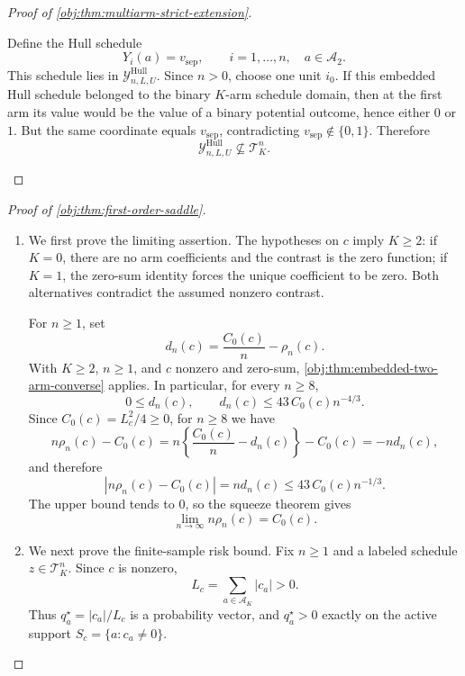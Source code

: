 \begin{proof}[Proof of \cref{obj:thm:multiarm-strict-extension}]
\begin{enumerate}
Define the Hull schedule
\[
Y_i(a)=v_{\mathrm{sep}},
\qquad
i=1,\ldots,n,\quad a\in\mathcal A_2 .
\]
This schedule lies in \(\mathcal Y^{\mathrm{Hull}}_{n,L,U}\). Since \(n>0\), choose one unit \(i_0\). If this embedded Hull schedule belonged to the binary \(K\)-arm schedule domain, then at the first arm its value would be the value of a binary potential outcome, hence either \(0\) or \(1\). But the same coordinate equals \(v_{\mathrm{sep}}\), contradicting \(v_{\mathrm{sep}}\notin\{0,1\}\). Therefore
\[
\mathcal Y^{\mathrm{Hull}}_{n,L,U}\nsubseteq \mathcal T_K^n .
\]
\end{enumerate}
\end{proof}

\begin{proof}[Proof of \cref{obj:thm:first-order-saddle}]
\begin{enumerate}
\item We first prove the limiting assertion. The hypotheses on \(c\) imply \(K\ge 2\): if \(K=0\), there are no arm coefficients and the contrast is the zero function; if \(K=1\), the zero-sum identity forces the unique coefficient to be zero. Both alternatives contradict the assumed nonzero contrast. %

For \(n\ge 1\), set
\[
d_n(c)=\frac{C_0(c)}{n}-\rho_n(c).
\]
With \(K\ge 2\), \(n\ge 1\), and \(c\) nonzero and zero-sum, \cref{obj:thm:embedded-two-arm-converse} applies. In particular, for every \(n\ge 8\),
\[
0\le d_n(c),
\qquad
d_n(c)\le 43\,C_0(c)n^{-4/3}.
\]
Since \(C_0(c)=L_c^2/4\ge 0\), for \(n\ge 8\) we have
\[
n\rho_n(c)-C_0(c)
=
n\left\{\frac{C_0(c)}{n}-d_n(c)\right\}-C_0(c)
=
-nd_n(c),
\]
and therefore
\[
\left|n\rho_n(c)-C_0(c)\right|
=
nd_n(c)
\le
43\,C_0(c)n^{-1/3}.
\]
The upper bound tends to \(0\), so the squeeze theorem gives
\[
\lim_{n\to\infty} n\rho_n(c)=C_0(c).
\]

\item We next prove the finite-sample risk bound. Fix \(n\ge 1\) and a labeled schedule \(z\in\mathcal T_K^n\). Since \(c\) is nonzero,
\[
L_c=\sum_{a\in\mathcal A_K}|c_a|>0.
\]
Thus \(q_a^\star=|c_a|/L_c\) is a probability vector, and \(q_a^\star>0\) exactly on the active support \(S_c=\{a:c_a\ne0\}\).


\end{enumerate}
\end{proof}
